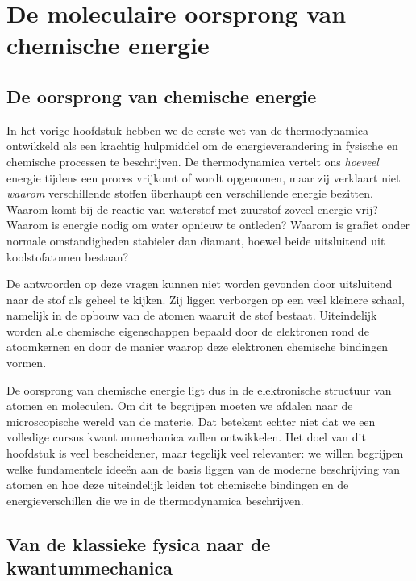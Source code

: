 \chapter{De moleculaire oorsprong van chemische energie}

\section{De oorsprong van chemische energie}

In het vorige hoofdstuk hebben we de eerste wet van de thermodynamica ontwikkeld als een krachtig hulpmiddel om  de energieverandering in fysische en chemische processen te beschrijven. De thermodynamica vertelt ons \emph{hoeveel} energie tijdens een proces vrijkomt of wordt opgenomen, maar zij verklaart niet \emph{waarom} verschillende stoffen überhaupt een verschillende energie bezitten. Waarom komt bij de reactie van waterstof met zuurstof zoveel energie vrij? Waarom is energie nodig om water opnieuw te ontleden? Waarom is grafiet onder normale omstandigheden stabieler dan diamant, hoewel beide uitsluitend uit koolstofatomen bestaan?

De antwoorden op deze vragen kunnen niet worden gevonden door uitsluitend naar de stof als geheel te kijken. Zij liggen verborgen op een veel kleinere schaal, namelijk in de opbouw van de atomen waaruit de stof bestaat. Uiteindelijk worden alle chemische eigenschappen bepaald door de elektronen rond de atoomkernen en door de manier waarop deze elektronen chemische bindingen vormen.

De oorsprong van chemische energie ligt dus in de elektronische structuur van atomen en moleculen. Om dit te begrijpen moeten we afdalen naar de microscopische wereld van de materie. Dat betekent echter niet dat we een volledige cursus kwantummechanica zullen ontwikkelen. Het doel van dit hoofdstuk is veel bescheidener, maar tegelijk veel relevanter: we willen begrijpen welke fundamentele idee\"en aan de basis liggen van de moderne beschrijving van atomen en hoe deze uiteindelijk leiden tot chemische bindingen en de energieverschillen die we in de thermodynamica beschrijven.

\section{Van de klassieke fysica naar de kwantummechanica}

